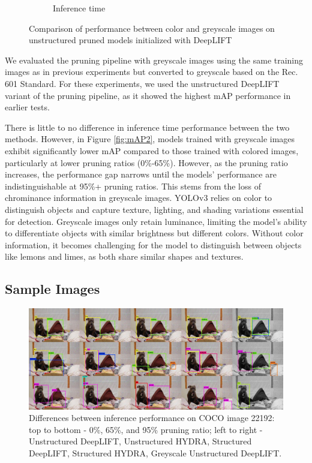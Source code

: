 \documentclass[10pt]{cai}
\begin{document}
\begin{figure}
\begin{subfigure}[b]{.45\textwidth}
      \caption{Inference time}
      \label{fig:time2}
    \end{subfigure}
    \caption{Comparison of performance between color and greyscale images on unstructured pruned models initialized with DeepLIFT}
    \label{fig:result2}
\end{figure}

We evaluated the pruning pipeline with greyscale images using the same training images as in previous experiments but converted to greyscale based on the Rec. 601 Standard. For these experiments, we used the unstructured DeepLIFT variant of the pruning pipeline, as it showed the highest mAP performance in earlier tests.

There is little to no difference in inference time performance between the two methods. However, in Figure \ref{fig:mAP2}, models trained with greyscale images exhibit significantly lower mAP compared to those trained with colored images, particularly at lower pruning ratios (0\%-65\%). However, as the pruning ratio increases, the performance gap narrows until the models' performance are indistinguishable at 95\%+ pruning ratios. This stems from the loss of chrominance information in greyscale images. YOLOv3 relies on color to distinguish objects and capture texture, lighting, and shading variations essential for detection. Greyscale images only retain luminance, limiting the model's ability to differentiate objects with similar brightness but different colors. Without color information, it becomes challenging for the model to distinguish between objects like lemons and limes, as both share similar shapes and textures.

\subsection{Sample Images}

\begin{figure}
    \centering
    \captionsetup{justification=centering}
    \includegraphics[width=0.8\linewidth]{figs/22192select.jpg}
    \caption{Differences between inference performance on COCO image 22192: top to bottom - 0\%, 65\%, and 95\% pruning ratio; left to right - Unstructured DeepLIFT, Unstructured HYDRA, Structured DeepLIFT, Structured HYDRA, Greyscale Unstructured DeepLIFT.}
    \label{fig:22192select}
\end{figure}
\end{document}
